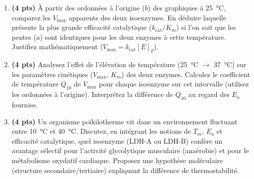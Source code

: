 \documentclass[11pt]{article}
\begin{document}
\begin{exercice}
\begin{enumerate}
\item \textbf{(4 pts)} À partir des ordonnées à l'origine ($b$) des graphiques à \SI{25}{\celsius}, comparez les $V_{\text{max}}$ apparents des deux isoenzymes. En déduire laquelle présente la plus grande efficacité catalytique ($k_{\text{cat}}/K_m$) si l'on sait que les pentes ($a$) sont identiques pour les deux enzymes à cette température. Justifiez mathématiquement ($V_{\text{max}} = k_{\text{cat}}[E]_T$).
\item \textbf{(4 pts)} Analysez l'effet de l'élévation de température (\SI{25}{\celsius} $\to$ \SI{37}{\celsius}) sur les paramètres cinétiques ($V_{\text{max}}$, $K_m$) des deux enzymes. Calculez le coefficient de température $Q_{10}$ de $V_{\text{max}}$ pour chaque isoenzyme sur cet intervalle (utilisez les ordonnées à l'origine). Interprétez la différence de $Q_{10}$ au regard des $E_a$ fournies.
\item \textbf{(4 pts)} Un organisme poïkilotherme vit dans un environnement fluctuant entre \SI{10}{\celsius} et \SI{40}{\celsius}. Discutez, en intégrant les notions de $T_m$, $E_a$ et efficacité catalytique, quel isoenzyme (LDH-A ou LDH-B) confère un avantage sélectif pour l'activité glycolytique musculaire (anaérobie) et pour le métabolisme oxydatif cardiaque. Proposez une hypothèse moléculaire (structure secondaire/tertiaire) expliquant la différence de thermostabilité.
\end{enumerate}
\end{exercice}
\end{document}
